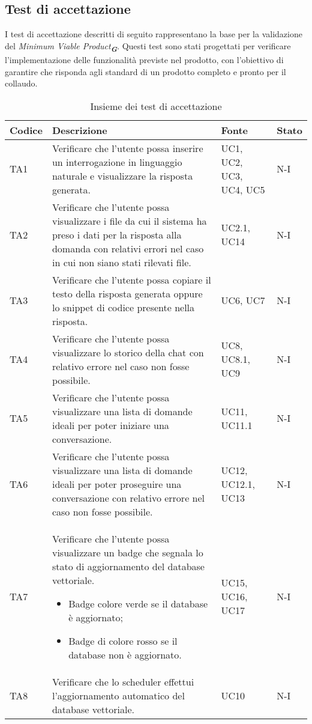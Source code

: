 \newpage


\subsection{Test di accettazione}
\label{sec:Test di accettazione}
I test di accettazione descritti di seguito rappresentano la base per la validazione del \emph{Minimum Viable Product}\textsubscript{\textit{\textbf{G}}}. Questi test sono stati progettati per verificare l’implementazione delle funzionalità previste nel prodotto, con l’obiettivo di garantire che risponda agli standard di un prodotto completo e pronto per il collaudo.

\begin{table}[h!]
    \centering
    \renewcommand{\arraystretch}{1.5} %
    \begin{tabularx}{\textwidth}{|p{}|X|p{}|p{}|}\hline
    \rowcolor[HTML]{FFD700}
    \textbf{Codice} & \textbf{Descrizione} & \textbf{Fonte} & \textbf{Stato} \\ \hline
    TA1 & Verificare che l'utente possa inserire un interrogazione in linguaggio naturale e visualizzare la risposta generata. & UC1, UC2, UC3, UC4, UC5 & N-I \\ \hline
    TA2 & Verificare che l'utente possa visualizzare i file da cui il sistema ha preso i dati per la risposta alla domanda con relativi errori nel caso in cui non siano stati rilevati file.  & UC2.1, UC14 & N-I \\ \hline
    TA3 & Verificare che l'utente possa copiare il testo della risposta generata oppure lo snippet di codice presente nella risposta. & UC6, UC7 & N-I \\ \hline
    TA4 & Verificare che l'utente possa visualizzare lo storico della chat con relativo errore nel caso non fosse possibile.  & UC8, UC8.1, UC9 & N-I \\ \hline
    TA5 & Verificare che l'utente possa visualizzare una lista di domande ideali per poter iniziare una conversazione. & UC11, UC11.1 & N-I \\ \hline
    TA6 & Verificare che l'utente possa visualizzare una lista di domande ideali per poter proseguire una conversazione con relativo errore nel caso non fosse possibile. & UC12, UC12.1, UC13 & N-I \\ \hline
    TA7 & Verificare che l'utente possa visualizzare un badge che segnala lo stato di aggiornamento del database vettoriale.
    \begin{itemize}
        \item Badge colore verde se il database è aggiornato;
        \item Badge di colore rosso se il database non è aggiornato.
    \end{itemize} 
        & UC15, UC16, UC17 & N-I \\ \hline
    TA8 & Verificare che lo scheduler effettui l'aggiornamento automatico del database vettoriale. & UC10 & N-I \\ \hline

    \end{tabularx}
    \caption{Insieme dei test di accettazione}
\end{table}
